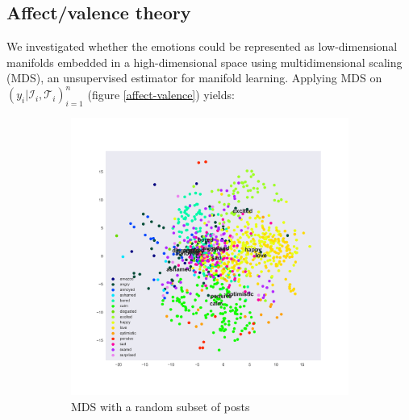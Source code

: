 \documentclass{article} %
\begin{document}
\subsection{Affect/valence theory}

We investigated whether the emotions could be represented as low-dimensional manifolds embedded in a high-dimensional space using multidimensional scaling (MDS), an unsupervised estimator for manifold learning. Applying MDS on $(y_i | \mathcal{I}_i, \mathcal{T}_i)_{i=1}^n$ (figure \ref{affect-valence}) yields:
\begin{figure}[H]
    \begin{subfigure}[t]{.5\textwidth}
        \vskip 0pt %
        \centering
        \includegraphics[width=\linewidth]{Images/mds.png}
        \caption{MDS with a random subset of posts}
   \end{subfigure}
   \begin{subfigure}[t]{.5\textwidth}
       \vskip 0pt
       \centering

\end{subfigure}
\end{figure}
\end{document}
